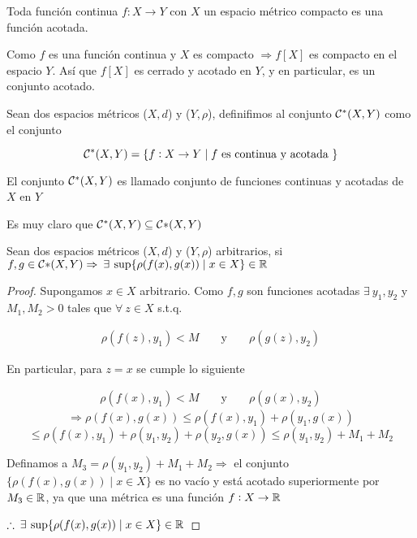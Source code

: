 \begin{eg}
    Toda función continua $f : X \to Y$ con $X$ un espacio métrico compacto es una función acotada.
\end{eg}

\begin{proofexplanation}
    Como $f$ es una función continua y $X$ es compacto $\Rightarrow f[X]$ es compacto en el espacio $Y$. Así que $f[X]$ es cerrado y acotado en $Y$, y en particular, es un conjunto acotado.
\end{proofexplanation}

\begin{definition}
    Sean dos espacios métricos ($X,d$) y ($Y,\rho$), definifimos al conjunto ${\mathcal{C}}^{\ast}(X,Y)$ como el conjunto

    $${\mathcal{C}}^{\ast}(X,Y)  = \{ f : X \to Y \mid f \text{ es continua y acotada } \}$$

    El conjunto ${\mathcal{C}}^{\ast}(X,Y)$ es llamado conjunto de funciones continuas y acotadas de $X$ en $Y$
\end{definition}

\begin{corollary}
    Es muy claro que ${\mathcal{C}}^{\ast}(X,Y) \subseteq \mathcal{C}{\ast}(X,Y)$
\end{corollary}

\begin{lemma} \label{lemma511}
    Sean dos espacios métricos ($X,d$) y ($Y,\rho$) arbitrarios, si $f,g \in \mathcal{C}{\ast}(X,Y) \Rightarrow \: \exists \: \sup \{ \rho(f(x),g(x)) \mid x \in X \} \in \mathbb{R}$
\end{lemma}

\begin{proof}
    Supongamos $x \in X$ arbitrario. Como $f,g$ son funciones acotadas $\exists \: y_1, y_2$ y $M_1, M_2 > 0$ tales que $\forall \: z \in X$ s.t.q.

    \begin{align*}
         \rho(f(z),y_1) < M && \text{ y } && \rho(g(z),y_2)
    \end{align*}

    En particular, para $z = x$ se cumple lo siguiente

    \begin{align*}
         \rho(f(x),y_1) < M && \text{ y } && \rho(g(x),y_2)
    \end{align*}
    $$\Rightarrow \rho(f(x),g(x)) \leqslant \rho(f(x),y_1) + \rho(y_1,g(x))$$
    $$\leqslant \rho(f(x),y_1) + \rho(y_1,y_2) + \rho(y_2,g(x)) \leqslant \rho(y_1,y_2) + M_1 + M_2$$

    Definamos a $M_3 = \rho(y_1,y_2) + M_1 + M_2 \Rightarrow$ el conjunto $\{ \rho(f(x),g(x)) \mid x \in X \}$ es no vacío y está acotado superiormente por $M_3 \in \mathbb{R}$, ya que una métrica es una función $f : X \to \mathbb{R}$

    $\therefore \: \exists \: \sup \{ \rho(f(x),g(x)) \mid x \in X \} \in \mathbb{R}$
\end{proof}

